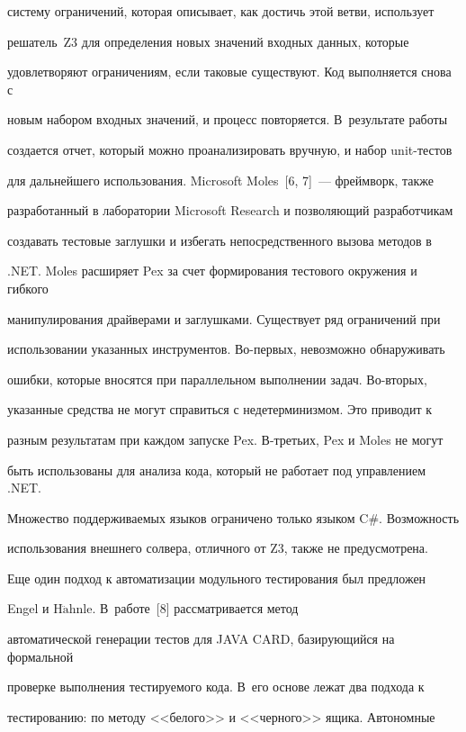 систему ограничений, которая описывает, как достичь этой ветви, использует


решатель~Z3 для определения новых значений входных данных, которые


удовлетворяют ограничениям, если таковые существуют. Код выполняется снова с


новым набором входных значений, и процесс повторяется. В~результате работы


создается отчет, который можно проанализировать вручную, и набор unit-тес\-тов


для дальнейшего использования. Microsoft Moles~[6, 7]~--- фреймворк, также


разработанный в лаборатории Microsoft Research и позволяющий разработчикам


создавать тестовые заглушки и избегать непосредственного вызова методов в


.NET. Moles расширяет Pex за счет формирования тестового окружения и гибкого


манипулирования драйверами и заглушками. Существует ряд ограничений при


использовании указанных инструментов. Во-пер\-вых, невозможно обнаруживать


ошибки, которые вносятся при параллельном выполнении задач. Во-вто\-рых,


указанные средства не могут справиться с недетерминизмом. Это приводит к


разным результатам при каждом запуске Pex. В-третьих, Pex и Moles не могут


быть использованы для анализа кода, который не работает под управлением .NET.


Множество поддерживаемых языков ограничено только языком C\#. Возможность


использования внешнего солвера, отличного от Z3, также не предусмотрена.





Еще один подход к автоматизации модульного тестирования был предложен


Engel и H$\ddot{\mbox{a}}$hnle. В~работе~[8] рассматривается метод


автоматической генерации тестов для JAVA CARD, базирующийся на формальной


проверке выполнения тестируемого кода. В~его основе лежат два подхода к


тестированию: по методу <<белого>> и <<черного>> ящика. Автономные


